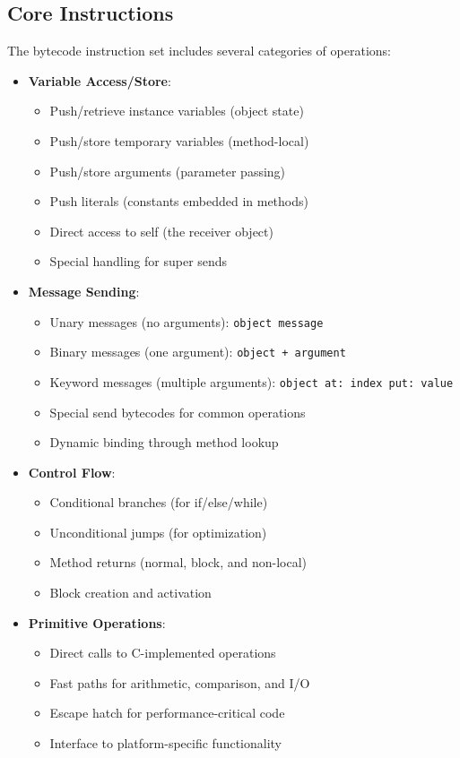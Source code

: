 \documentclass[12pt,a4paper]{report}
\begin{document}
\subsection{Core Instructions}
The bytecode instruction set includes several categories of operations:

\begin{itemize}
    \item \textbf{Variable Access/Store}:
    \begin{itemize}
        \item Push/retrieve instance variables (object state)
        \item Push/store temporary variables (method-local)
        \item Push/store arguments (parameter passing)
        \item Push literals (constants embedded in methods)
        \item Direct access to self (the receiver object)
        \item Special handling for super sends
    \end{itemize}
    
    \item \textbf{Message Sending}:
    \begin{itemize}
        \item Unary messages (no arguments): \texttt{object message}
        \item Binary messages (one argument): \texttt{object + argument}
        \item Keyword messages (multiple arguments): \texttt{object at: index put: value}
        \item Special send bytecodes for common operations
        \item Dynamic binding through method lookup
    \end{itemize}
    
    \item \textbf{Control Flow}:
    \begin{itemize}
        \item Conditional branches (for if/else/while)
        \item Unconditional jumps (for optimization)
        \item Method returns (normal, block, and non-local)
        \item Block creation and activation
    \end{itemize}
    
    \item \textbf{Primitive Operations}:
    \begin{itemize}
        \item Direct calls to C-implemented operations
        \item Fast paths for arithmetic, comparison, and I/O
        \item Escape hatch for performance-critical code
        \item Interface to platform-specific functionality
    \end{itemize}
\end{itemize}
\end{document}
